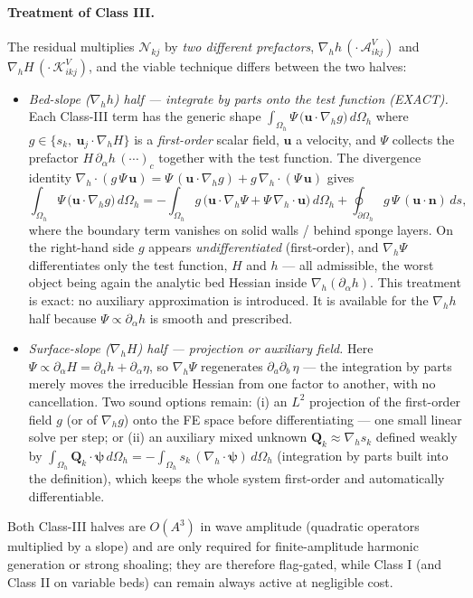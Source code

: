 \documentclass{article}
\newcommand{\uj}{\mathbf{u}_j}
\newcommand{\nablah}{\nabla_h}
\newcommand{\VAikj}{\boldsymbol{\mathcal{A}}_{ikj}^V}
\newcommand{\VKikj}{\boldsymbol{\mathcal{K}}_{ikj}^V}
\newcommand{\Oh}{\Omega_h}
\begin{document}
\paragraph{Treatment of Class III.} The residual multiplies $\mathcal{N}_{kj}$ by \emph{two different prefactors}, $\nablah h\,(\cdot\,\VAikj)$ and $\nablah H\,(\cdot\,\VKikj)$, and the viable technique differs between the two halves:
\begin{itemize}
    \item \emph{Bed-slope ($\nablah h$) half — integrate by parts onto the test function (EXACT).} Each Class-III term has the generic shape $\int_{\Oh} \Psi\, \big(\mathbf{u}\cdot\nablah g\big)\, d\Oh$ where $g \in \{s_k,\ \uj\cdot\nablah H\}$ is a \emph{first-order} scalar field, $\mathbf{u}$ a velocity, and $\Psi$ collects the prefactor $H\,\partial_\alpha h\,(\cdots)_c$ together with the test function. The divergence identity $\nablah\cdot(g\,\Psi\,\mathbf{u}) = \Psi\,(\mathbf{u}\cdot\nablah g) + g\,\nablah\cdot(\Psi\,\mathbf{u})$ gives
    \begin{equation}
        \int_{\Oh} \Psi\,\big(\mathbf{u}\cdot\nablah g\big)\,d\Oh
        = -\int_{\Oh} g\,\big(\mathbf{u}\cdot\nablah\Psi + \Psi\,\nablah\cdot\mathbf{u}\big)\,d\Oh
        + \oint_{\partial\Oh} g\,\Psi\,(\mathbf{u}\cdot\mathbf{n})\,ds ,
        \label{eq: class III IBP}
    \end{equation}
    where the boundary term vanishes on solid walls / behind sponge layers. On the right-hand side $g$ appears \emph{undifferentiated} (first-order), and $\nablah\Psi$ differentiates only the test function, $H$ and $h$ — all admissible, the worst object being again the analytic bed Hessian inside $\nablah(\partial_\alpha h)$. This treatment is exact: no auxiliary approximation is introduced. It is available for the $\nablah h$ half because $\Psi \propto \partial_\alpha h$ is smooth and prescribed.
    \item \emph{Surface-slope ($\nablah H$) half — projection or auxiliary field.} Here $\Psi \propto \partial_\alpha H = \partial_\alpha h + \partial_\alpha\eta$, so $\nablah\Psi$ regenerates $\partial_a\partial_b\,\eta$ — the integration by parts merely moves the irreducible Hessian from one factor to another, with no cancellation. Two sound options remain: (i) an $L^2$ projection of the first-order field $g$ (or of $\nablah g$) onto the FE space before differentiating — one small linear solve per step; or (ii) an auxiliary mixed unknown $\mathbf{Q}_k \approx \nablah s_k$ defined weakly by $\int_{\Oh}\mathbf{Q}_k\cdot\boldsymbol{\psi}\,d\Oh = -\int_{\Oh} s_k\,(\nablah\cdot\boldsymbol{\psi})\,d\Oh$ (integration by parts built into the definition), which keeps the whole system first-order and automatically differentiable.
\end{itemize}
Both Class-III halves are $O(A^3)$ in wave amplitude (quadratic operators multiplied by a slope) and are only required for finite-amplitude harmonic generation or strong shoaling; they are therefore flag-gated, while Class I (and Class II on variable beds) can remain always active at negligible cost.
\end{document}
